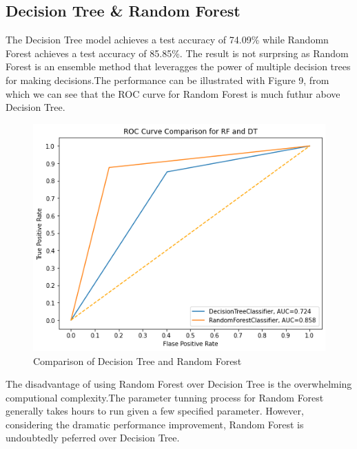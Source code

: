 \documentclass[10pt,twocolumn]{article}
\begin{document}
	\subsection{Decision Tree \& Random Forest}
	The Decision Tree model achieves a test accuracy of 74.09\% while Randomn Forest achieves a test accuracy of 85.85\%. The result is not surprsing as Random Forest is an ensemble method that leveragges the power of multiple decision trees for making decisions.The performance can be illustrated with Figure 9, from which we can see that the ROC curve for Random Forest is much futhur above Decision Tree. 
	\begin{figure}[H]
		\includegraphics[width=\columnwidth]{ROC_RF_DT}
		\caption{Comparison of Decision Tree and Random Forest}\label{ROC_RF_DT}
	\end{figure} 
	The disadvantage of using Random Forest over Decision Tree is the overwhelming computional complexity.The parameter tunning process for Random Forest generally takes hours to run given a few specified parameter. However, considering the dramatic performance improvement, Random Forest is undoubtedly peferred over Decision Tree.
\end{document}
